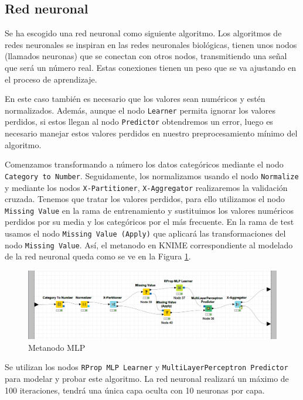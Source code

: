\documentclass[a4paper, 20pt]{article}
\begin{document}
\subsection{Red neuronal}

Se ha escogido una red neuronal como siguiente algoritmo. Los algoritmos de redes neuronales se inspiran en las redes neuronales biológicas, tienen unos nodos (llamados neuronas) que se conectan con otros nodos, transmitiendo una señal que será un número real. Estas conexiones tienen un peso que se va ajustando en el proceso de aprendizaje.  

En este caso también es necesario que los valores sean numéricos y estén normalizados. Además, aunque el nodo \texttt{Learner} permita ignorar los valores perdidos, si estos llegan al nodo \texttt{Predictor} obtendremos un error, luego es necesario manejar estos valores perdidos en nuestro preprocesamiento mínimo del algoritmo.

Comenzamos transformando a número los datos categóricos mediante el nodo \texttt{Category to Number}. Seguidamente, los normalizamos usando el nodo \texttt{Normalize} y mediante los nodos \texttt{X-Partitioner}, \texttt{X-Aggregator} realizaremos la validación cruzada. Tenemos que tratar los valores perdidos, para ello utilizamos el nodo \texttt{Missing Value} en la rama de entrenamiento y sustituimos los valores numéricos perdidos por su media y los categóricos por el más frecuente. En la rama de test usamos el nodo \texttt{Missing Value (Apply)} que aplicará las transformaciones del nodo \texttt{Missing Value}. Así, el metanodo en KNIME correspondiente al modelado de la red neuronal queda como se ve en la Figura \ref{fig:MLP}. 

\begin{figure}[H]
    \centering
    \includegraphics[width=1\textwidth]{MLP}
    \caption{Metanodo MLP}
    \label{fig:MLP}
\end{figure}

Se utilizan los nodos \texttt{RProp MLP Learner} y \texttt{MultiLayerPerceptron Predictor} para modelar y probar este algoritmo. La red neuronal realizará un máximo de 100 iteraciones, tendrá una única capa oculta con 10 neuronas por capa.
\end{document}
